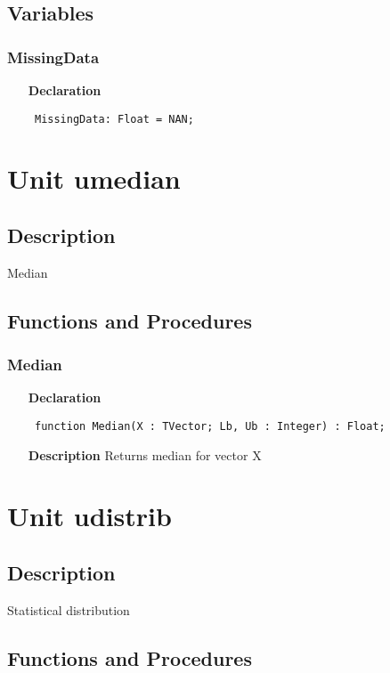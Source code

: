\documentclass[12pt,a4paper,oneside]{report}
\newcommand{\declarationitem}[1]{\textbf{#1}}
\newcommand{\descriptiontitle}[1]{\textbf{#1}}
\newcommand{\code}[1]{\texttt{#1}}
\begin{document}
\subsection{Variables}
\subsubsection{MissingData}
\label{umeansd_md-MissingData}
\begin{itemize}\item[\declarationitem{Declaration}\hfill]
	\begin{flushleft}
		\code{
			MissingData: Float = NAN;}
	\end{flushleft}
\end{itemize}
\section{Unit umedian}
\label{umedian}
\subsection{Description}
Median 
\subsection{Functions and Procedures}
\subsubsection{Median}
\label{umedian-Median}
\begin{itemize}\item[\declarationitem{Declaration}\hfill]
	\begin{flushleft}
		\code{
			function Median(X : TVector; Lb, Ub : Integer) : Float;}
	\end{flushleft}
	\item[\descriptiontitle{Description}]
	Returns median for vector X
\end{itemize}
\section{Unit udistrib}
\label{udistrib}
\subsection{Description}
Statistical distribution 
\subsection{Functions and Procedures}
\end{document}
